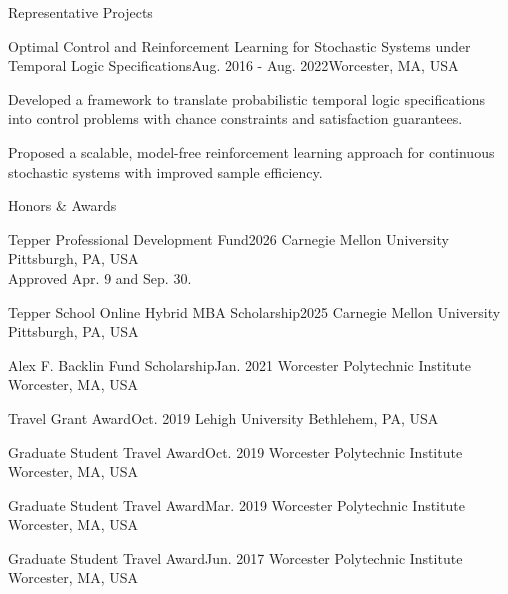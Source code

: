 \documentclass{resume} %
\begin{document}
\begin{rSection}{Representative Projects}
\begin{rSubsection}{Optimal Control and Reinforcement Learning for Stochastic Systems under Temporal Logic Specifications}{Aug. 2016 - Aug. 2022}{}{Worcester, MA, USA}
\item Developed a framework to translate probabilistic temporal logic specifications into control problems with chance constraints and satisfaction guarantees.
\item Proposed a scalable, model-free reinforcement learning approach for continuous stochastic systems with improved sample efficiency.
\end{rSubsection}

\end{rSection}

\begin{rSection}{Honors \& Awards}

\begin{nSubsection}
{Tepper Professional Development Fund}{2026}
{Carnegie Mellon University}
{Pittsburgh, PA, USA}
\\ Approved Apr. 9 and Sep. 30.
\end{nSubsection}

\begin{nSubsection}
{Tepper School Online Hybrid MBA Scholarship}{2025}
{Carnegie Mellon University}
{Pittsburgh, PA, USA}
\end{nSubsection}

\begin{nSubsection}
{Alex F. Backlin Fund Scholarship}{Jan. 2021}
{Worcester Polytechnic Institute}
{Worcester, MA, USA}
\end{nSubsection}

\begin{nSubsection}
{Travel Grant Award}{Oct. 2019}
{Lehigh University}
{Bethlehem, PA, USA}
\end{nSubsection}

\begin{nSubsection}
{Graduate Student Travel Award}{Oct. 2019}
{Worcester Polytechnic Institute}
{Worcester, MA, USA}
\end{nSubsection}

\begin{nSubsection}
{Graduate Student Travel Award}{Mar. 2019}
{Worcester Polytechnic Institute}
{Worcester, MA, USA}
\end{nSubsection}

\begin{nSubsection}
{Graduate Student Travel Award}{Jun. 2017}
{Worcester Polytechnic Institute}
{Worcester, MA, USA}
\end{nSubsection}

\end{rSection}
\end{document}

